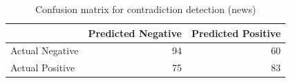 \begin{table}
\caption{Confusion matrix for contradiction detection (news)}
\label{tab:confusion_matrix}
\begin{tabular}{lrr}
\toprule
 & Predicted Negative & Predicted Positive \\
\midrule
Actual Negative & 94 & 60 \\
Actual Positive & 75 & 83 \\
\bottomrule
\end{tabular}
\end{table}

